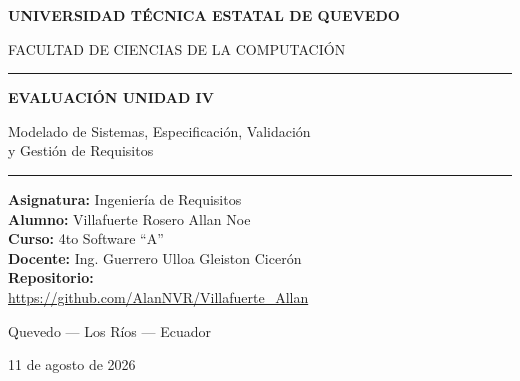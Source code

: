 \documentclass[12pt,letterpaper]{article}
\begin{document}
\begin{titlepage}
\thispagestyle{empty}
\centering

\vspace*{1.2cm}

{\LARGE\bfseries UNIVERSIDAD TÉCNICA ESTATAL DE QUEVEDO\par}

\vspace{0.6cm}

{\Large FACULTAD DE CIENCIAS DE LA COMPUTACIÓN\par}

\vspace{1.4cm}

\rule{\linewidth}{0.6pt}

\vspace{0.8cm}

{\Large\bfseries EVALUACIÓN UNIDAD IV\par}

\vspace{0.5cm}

{\large Modelado de Sistemas, Especificación, Validación\\
y Gestión de Requisitos\par}

\vspace{0.8cm}

\rule{\linewidth}{0.6pt}

\vspace{1.8cm}
\begin{center} 
 \textbf{Asignatura:} Ingeniería de Requisitos \\
 \textbf{Alumno:} Villafuerte Rosero Allan Noe \\
 \textbf{Curso:}  4to Software ``A'' \\
 \textbf{Docente:}  Ing. Guerrero Ulloa Gleiston Cicerón\\ 
 \textbf{Repositorio:} \\\url{https://github.com/AlanNVR/Villafuerte_Allan}
\end{center}
\vfill

{\large Quevedo --- Los Ríos --- Ecuador\par}
\vspace{0.3cm}
{\large 11 de agosto de 2026\par}

\end{titlepage}
\end{document}

